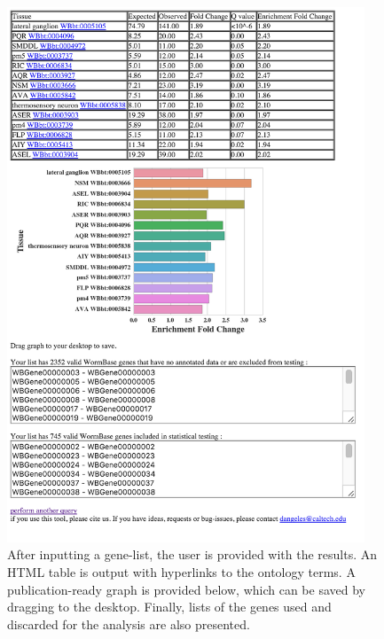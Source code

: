 \documentclass[linenumbers, doublespacing]{bmcart}
\begin{document}
\begin{backmatter}
\begin{figure}
	\centering
    \includegraphics[width=0.95\textwidth]{figures/guiresults.png}
  	\captionsetup{width= 0.95\textwidth}
 	\caption{
  After inputting a gene-list, the user is provided with the results. 
  An HTML table is output with hyperlinks to the ontology terms. A 
  publication-ready graph is provided below, which can be saved by 
  dragging to the desktop. Finally, lists of the genes used and discarded
  for the analysis are also presented.
  }
  \label{fig:GUIresults}
\end{figure}

%



\end{backmatter}
\end{document}
